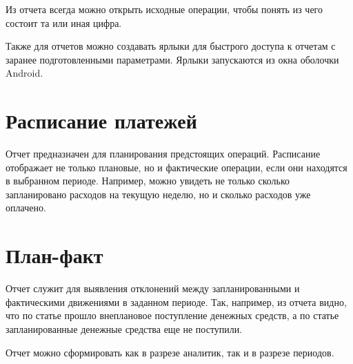\documentclass[a4paper,10pt,russian]{sphinxmanual}
\begin{document}
\noindent{}

\noindent{}

\noindent{}

\noindent{}

\noindent{}

Из отчета всегда можно открыть исходные операции, чтобы понять из чего состоит та или иная цифра.

Также для отчетов можно создавать ярлыки для быстрого доступа к отчетам с заранее подготовленными параметрами.
Ярлыки запускаются из окна оболочки Android.


\section{Расписание платежей}
\label{\detokenize{reports:id2}}
Отчет предназначен для планирования предстоящих операций. Расписание отображает не только плановые, но и фактические
операции, если они находятся в выбранном периоде. Например, можно увидеть не только сколько запланировано расходов
на текущую неделю, но и сколько расходов уже оплачено.

\noindent{}

\noindent{}

\noindent{}


\section{План-факт}
\label{\detokenize{reports:id3}}
Отчет служит для выявления отклонений между запланированными и фактическими движениями в заданном периоде. Так, например,
из отчета видно, что по статье  прошло внеплановое поступление денежных средств,
а по статье 
запланированные денежные средства еще не поступили.

Отчет можно сформировать как в разрезе аналитик, так и в разрезе периодов.
\end{document}
